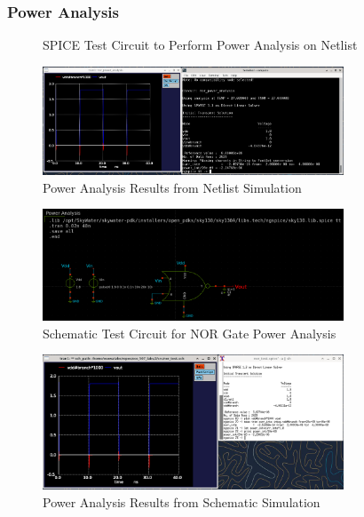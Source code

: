 \documentclass{article}
\begin{document}
	\subsubsection{Power Analysis}
	\begin{figure}[H]
		
		\caption{SPICE Test Circuit to Perform Power Analysis on Netlist}
		\label{fig::nor_power_analysis_test_circuit}
	\end{figure}
	
	\begin{figure}[H]
		\centerline{\includegraphics[width=0.8\textwidth]{nor_power_analysis.png}}
		\caption{Power Analysis Results from Netlist Simulation}
		\label{fig::nor_power_analysis}
	\end{figure}
	
	\begin{figure}[H]
		\centerline{\includegraphics[width=0.8\textwidth]{nor_power_analysis_test_circuit.png}}
		\caption{Schematic Test Circuit for NOR Gate Power Analysis}
		\label{fig::nor_power_analysis_test_circuit_schem}
	\end{figure}
	
	\begin{figure}[H]
		\centerline{\includegraphics[width=0.8\textwidth]{nor_power_analysis_schem.png}}
		\caption{Power Analysis Results from Schematic Simulation}
		\label{fig::nor_power_analysis_schem}
	\end{figure}
	
\end{document}
